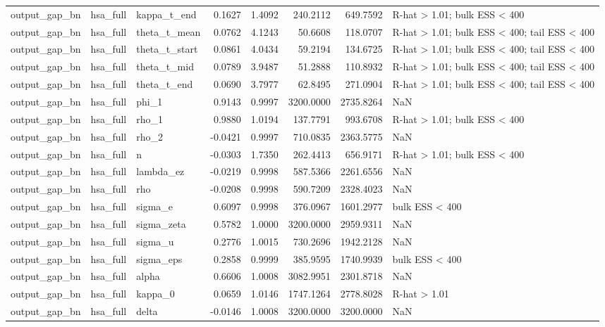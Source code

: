 \begin{tabular}{lllrrrrl}
output\_gap\_bn & hsa\_full & kappa\_t\_end & 0.1627 & 1.4092 & 240.2112 & 649.7592 & R-hat > 1.01; bulk ESS < 400 \\
output\_gap\_bn & hsa\_full & theta\_t\_mean & 0.0762 & 4.1243 & 50.6608 & 118.0707 & R-hat > 1.01; bulk ESS < 400; tail ESS < 400 \\
output\_gap\_bn & hsa\_full & theta\_t\_start & 0.0861 & 4.0434 & 59.2194 & 134.6725 & R-hat > 1.01; bulk ESS < 400; tail ESS < 400 \\
output\_gap\_bn & hsa\_full & theta\_t\_mid & 0.0789 & 3.9487 & 51.2888 & 110.8932 & R-hat > 1.01; bulk ESS < 400; tail ESS < 400 \\
output\_gap\_bn & hsa\_full & theta\_t\_end & 0.0690 & 3.7977 & 62.8495 & 271.0904 & R-hat > 1.01; bulk ESS < 400; tail ESS < 400 \\
output\_gap\_bn & hsa\_full & phi\_1 & 0.9143 & 0.9997 & 3200.0000 & 2735.8264 & NaN \\
output\_gap\_bn & hsa\_full & rho\_1 & 0.9880 & 1.0194 & 137.7791 & 993.6708 & R-hat > 1.01; bulk ESS < 400 \\
output\_gap\_bn & hsa\_full & rho\_2 & -0.0421 & 0.9997 & 710.0835 & 2363.5775 & NaN \\
output\_gap\_bn & hsa\_full & n & -0.0303 & 1.7350 & 262.4413 & 656.9171 & R-hat > 1.01; bulk ESS < 400 \\
output\_gap\_bn & hsa\_full & lambda\_ez & -0.0219 & 0.9998 & 587.5366 & 2261.6556 & NaN \\
output\_gap\_bn & hsa\_full & rho & -0.0208 & 0.9998 & 590.7209 & 2328.4023 & NaN \\
output\_gap\_bn & hsa\_full & sigma\_e & 0.6097 & 0.9998 & 376.0967 & 1601.2977 & bulk ESS < 400 \\
output\_gap\_bn & hsa\_full & sigma\_zeta & 0.5782 & 1.0000 & 3200.0000 & 2959.9311 & NaN \\
output\_gap\_bn & hsa\_full & sigma\_u & 0.2776 & 1.0015 & 730.2696 & 1942.2128 & NaN \\
output\_gap\_bn & hsa\_full & sigma\_eps & 0.2858 & 0.9999 & 385.9595 & 1740.9939 & bulk ESS < 400 \\
output\_gap\_bn & hsa\_full & alpha & 0.6606 & 1.0008 & 3082.9951 & 2301.8718 & NaN \\
output\_gap\_bn & hsa\_full & kappa\_0 & 0.0659 & 1.0146 & 1747.1264 & 2778.8028 & R-hat > 1.01 \\
output\_gap\_bn & hsa\_full & delta & -0.0146 & 1.0008 & 3200.0000 & 3200.0000 & NaN \\

\end{tabular}
